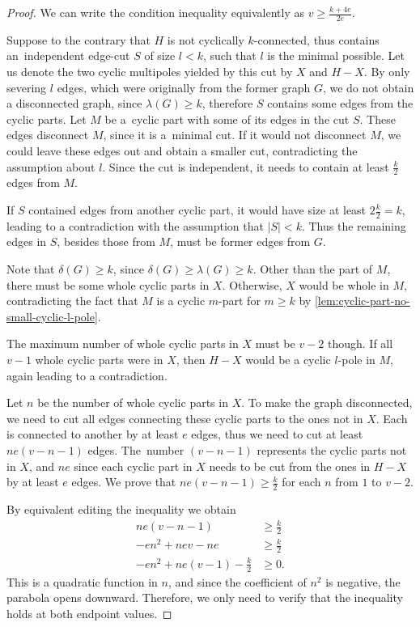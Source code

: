 \documentclass[12pt, twoside]{book}
\begin{document}
\begin{proof}
	We can write the condition inequality equivalently as $v\geq \frac{k+4e}{2e}$.
	
	Suppose to the contrary that $H$ is not cyclically $k$-connected, thus contains an~independent \mbox{edge-cut} $S$ of size $l<k$, such that $l$ is the minimal possible. Let us denote the two cyclic multipoles yielded by this cut by $X$ and $H-X$. By only severing $l$ edges, which were originally from the former graph $G$, we do not obtain a disconnected graph, since $\lambda(G)\geq k$, therefore $S$ contains some edges from the cyclic parts. Let $M$ be a~cyclic part with some of its edges in the cut $S$. These edges disconnect $M$, since it is a~minimal cut. If it would not disconnect $M$, we could leave these edges out and obtain a smaller cut, contradicting the assumption about $l$. Since the cut is independent, it needs to contain at least $\frac{k}{2}$ edges from $M$.
	
	If $S$ contained edges from another cyclic part, it would have size at least $2\frac{k}{2}=k$, leading to a contradiction with the assumption that $|S|<k$. Thus the remaining edges in $S$, besides those from $M$, must be former edges from $G$.
	
	Note that $\delta(G)\geq k$, since $\delta(G)\geq \lambda(G)\geq k$. Other than the part of $M$, there must be some whole cyclic parts in $X$. Otherwise, $X$ would be whole in $M$, contradicting the fact that $M$ is a cyclic $m$-part for $m\geq k$ by \cref{lem:cyclic-part-no-small-cyclic-l-pole}.
	
	The maximum number of whole cyclic parts in $X$ must be $v-2$ though. If all $v-1$ whole cyclic parts were in $X$, then $H-X$ would be a cyclic $l$-pole in $M$, again leading to a contradiction.
	
	Let $n$ be the number of whole cyclic parts in $X$. To make the graph disconnected, we need to cut all edges connecting these cyclic parts to the ones not in $X$. Each is connected to another by at least $e$ edges, thus we need to cut at least $ne(v-n-1)$ edges. The~number $(v-n-1)$ represents the cyclic parts not in $X$, and $ne$ since each cyclic part in $X$ needs to be cut from the ones in $H-X$ by at least $e$ edges. We prove that $ne(v-n-1)\geq\frac{k}{2}$ for each $n$ from $1$ to $v-2$.
	
	By equivalent editing the inequality we obtain
	\begin{align*}
		ne(v-n-1)&\geq\frac{k}{2} \\
		-en^2+nev-ne&\geq \frac{k}{2} \\
		-en^2+ne(v-1)-\frac{k}{2}&\geq 0.
	\end{align*}
	This is a quadratic function in $n$, and since the coefficient of $n^2$ is negative, the parabola opens downward. Therefore, we only need to verify that the inequality holds at both endpoint values.
	

\end{proof}
\end{document}
